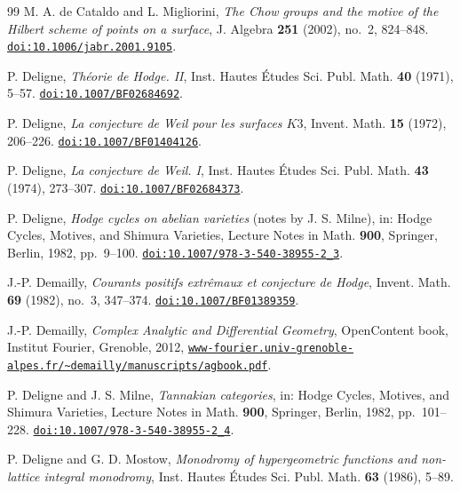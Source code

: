 \begin{thebibliography}{99}
M. A. de Cataldo and L. Migliorini,
\emph{The Chow groups and the motive of the Hilbert scheme of points on a
surface},
J. Algebra \textbf{251} (2002), no.~2, 824--848.
\href{https://doi.org/10.1006/jabr.2001.9105}{\texttt{doi:10.1006/jabr.2001.9105}}.

P. Deligne,
\emph{Th\'eorie de Hodge. II},
Inst. Hautes \'Etudes Sci. Publ. Math. \textbf{40} (1971), 5--57.
\href{https://doi.org/10.1007/BF02684692}{\texttt{doi:10.1007/BF02684692}}.

P. Deligne,
\emph{La conjecture de Weil pour les surfaces $K3$},
Invent. Math. \textbf{15} (1972), 206--226.
\href{https://doi.org/10.1007/BF01404126}{\texttt{doi:10.1007/BF01404126}}.

P. Deligne,
\emph{La conjecture de Weil. I},
Inst. Hautes \'Etudes Sci. Publ. Math. \textbf{43} (1974), 273--307.
\href{https://doi.org/10.1007/BF02684373}{\texttt{doi:10.1007/BF02684373}}.

P. Deligne,
\emph{Hodge cycles on abelian varieties} (notes by J. S. Milne),
in: Hodge Cycles, Motives, and Shimura Varieties,
Lecture Notes in Math. \textbf{900}, Springer, Berlin, 1982, pp.~9--100.
\href{https://doi.org/10.1007/978-3-540-38955-2_3}%
{\texttt{doi:10.1007/978-3-540-38955-2\_3}}.

J.-P. Demailly,
\emph{Courants positifs extr\^emaux et conjecture de Hodge},
Invent. Math. \textbf{69} (1982), no.~3, 347--374.
\href{https://doi.org/10.1007/BF01389359}{\texttt{doi:10.1007/BF01389359}}.

J.-P. Demailly,
\emph{Complex Analytic and Differential Geometry},
OpenContent book, Institut Fourier, Grenoble, 2012,
\href{https://www-fourier.univ-grenoble-alpes.fr/~demailly/manuscripts/agbook.pdf}{\texttt{www-fourier.univ-grenoble-alpes.fr/\~{}demailly/manuscripts/agbook.pdf}}.

P. Deligne and J. S. Milne,
\emph{Tannakian categories},
in: Hodge Cycles, Motives, and Shimura Varieties,
Lecture Notes in Math. \textbf{900}, Springer, Berlin, 1982, pp.~101--228.
\href{https://doi.org/10.1007/978-3-540-38955-2_4}%
{\texttt{doi:10.1007/978-3-540-38955-2\_4}}.

P. Deligne and G. D. Mostow,
\emph{Monodromy of hypergeometric functions and non-lattice integral
monodromy},
Inst. Hautes \'Etudes Sci. Publ. Math. \textbf{63} (1986), 5--89.


\end{thebibliography}
